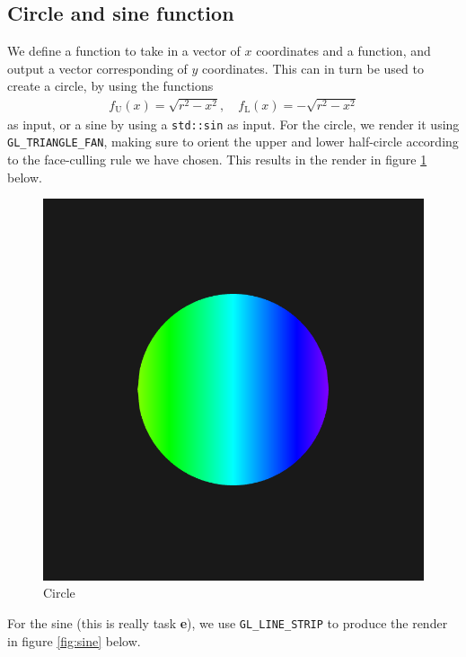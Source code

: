 \documentclass[]{article}
\begin{document}
\begin{multicols}{2}
\subsection{Circle and sine function}
We define a function to take in a vector of $x$ coordinates and a function, and output a vector corresponding of $y$ coordinates. This can in turn be used to create a circle, by using the functions
\begin{equation}\begin{aligned}
f_{\text{U}}(x) = \sqrt{r^2 - x^2},  \quad f_{\text{L}}(x) = -\sqrt{r^2 - x^2}
\end{aligned}\end{equation}
as input, or a sine by using a \texttt{std::sin} as input. For the circle, we render it using \texttt{GL\_TRIANGLE\_FAN}, making sure to orient the upper and lower half-circle according to the face-culling rule we have chosen. This results in the render in figure \ref{fig:circle} below.
\begin{figure}[H]
\centering
\includegraphics[width=\columnwidth]{circle.png}
\caption{Circle}
\label{fig:circle}
\end{figure}
For the sine (this is really task \textbf{e}), we use \texttt{GL\_LINE\_STRIP} to produce the render in figure \ref{fig:sine} below.
\begin{figure}[H]
\centering

\end{figure}
\end{multicols}
\end{document}
